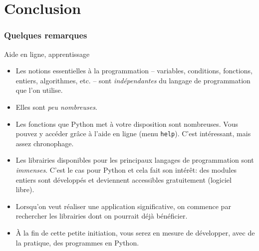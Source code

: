 \documentclass{beamer}
\newcommand{\mypause}{~}
\newcommand{\pyth}{{\sc Python}}
\newcommand{\prog}[1]{\alert{\texttt{#1}}}
\begin{document}
\section{Conclusion}


\frame
{
\frametitle{Quelques remarques}
{\footnotesize
\begin{block}{Aide en ligne, apprentissage}\mypause{}
\begin{itemize}
\item Les notions essentielles à la programmation -- variables, conditions, fonctions, entiers, algorithmes, etc. --
sont \alert{\em indépendantes} du langage de programmation que l'on utilise.\mypause{}
\item Elles sont \alert{\em peu nombreuses}.\mypause{}
\item Les fonctions que \pyth{} met à votre disposition sont nombreuses. Vous pouvez y accéder
grâce à l'aide en ligne (menu \prog{help}). C'est intéressant, mais assez chronophage.\mypause{}
\item Les librairies disponibles pour les principaux langages de programmation sont \alert{\em immenses}.
C'est le cas pour \pyth{} et cela fait son intérêt: des modules entiers sont développés et deviennent
accessibles gratuitement (logiciel libre).\mypause{}
\item Lorsqu'on veut réaliser une application significative, on commence par rechercher les
librairies dont on pourrait déjà bénéficier. \mypause{}
\item À la fin de cette petite initiation, vous serez en mesure de développer, avec de la pratique,
des programmes en \pyth{}.
\end{itemize}
\end{block}
}
}
\end{document}

